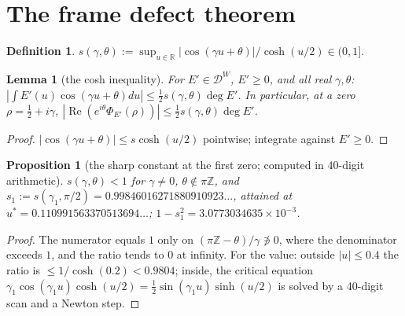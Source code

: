 \documentclass[11pt]{amsart}
\newtheorem{proposition}[theorem]{Proposition}
\newtheorem{lemma}[theorem]{Lemma}
\theoremstyle{definition}
\newtheorem{definition}[theorem]{Definition}
\theoremstyle{remark}
\newcommand{\R}{\mathbb R}
\newcommand{\Z}{\mathbb Z}
\newcommand{\Rel}{\operatorname{Re}}
\newcommand{\DW}{\mathcal D^{W}}
\newcommand{\dg}{\deg}
\begin{document}
\section{The frame defect theorem}\label{sec:defect}

\begin{definition}
$s(\gamma,\theta):=\sup_{u\in\R}|\cos(\gamma u+\theta)|/\cosh(u/2)\in(0,1]$.
\end{definition}

\begin{lemma}[the cosh inequality]\label{lem:cosh}
For $E'\in\DW$, $E'\ge0$, and all real $\gamma,\theta$:
$|\int E'(u)\cos(\gamma u+\theta)du|\le\frac12s(\gamma,\theta)\dg E'$. In particular, at a zero
$\rho=\frac12+i\gamma$, $|\Rel(e^{i\theta}\Phi_{E'}(\rho))|\le\frac12s(\gamma,\theta)\dg E'$.
\end{lemma}
\begin{proof}
$|\cos(\gamma u+\theta)|\le s\cosh(u/2)$ pointwise; integrate against $E'\ge0$.
\end{proof}

\begin{proposition}[the sharp constant at the first zero; computed in 40-digit arithmetic]\label{prop:s1}
$s(\gamma,\theta)<1$ for $\gamma\ne0$, $\theta\notin\pi\Z$, and
$s_1:=s(\gamma_1,\pi/2)=0.99846016271880910923\ldots$, attained at $u^*=0.110991563370513694\ldots$;
$1-s_1^2=3.0773034635\times10^{-3}$.
\end{proposition}
\begin{proof}
The numerator equals $1$ only on $(\pi\Z-\theta)/\gamma\not\ni0$, where the denominator exceeds $1$, and the
ratio tends to $0$ at infinity. For the value: outside $|u|\le0.4$ the ratio is $\le1/\cosh(0.2)<0.9804$;
inside, the critical equation $\gamma_1\cos(\gamma_1u)\cosh(u/2)=\frac12\sin(\gamma_1u)\sinh(u/2)$ is solved
by a 40-digit scan and a Newton step.
\end{proof}
\end{document}
